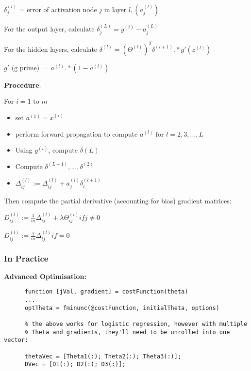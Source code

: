 \documentclass[12pt] {article}
\begin{document}
{      $\delta_j^{(l)}$ = error of activation node $j$ in layer $l, (a_j^{(l)})$

      For the output layer, calculate $\delta_j^{(L)} = y^{(i)} - a_j^{(L)}$

      For the hidden layers, calculate $\delta^{(l)} = (\Theta^{(l)})^T 
      \delta^{(l+1)} .* g'(z^{(l)})$

      $g' \text{ (g prime) } = a^{(l)} .* (1-a^{(l)})$

      \textbf{Procedure}:

      For $i = 1 \text{ to } m$
      \vspace{-1em}
      \begin{itemize}
        \item set $a^{(1)} = x^{(i)}$
        \item perform forward propagation to compute $a^{(l)} \text{ for } 
              l = 2,3,...,L$
        \item Using $y^{(i)}$, compute $\delta{(L)}$
        \item Compute $\delta^{(L-1)},\dots,\delta^{(2)}$
        \item $\Delta_{ij}^{(l)} := \Delta_{ij}^{(l)} + a_j^{(l)}
              \delta_i^{(l+1)}$
      \end{itemize}
      
      Then compute the partial derivative (accounting for bias) gradient
      matrices:

      $D_{ij}^{(l)} := \frac{1}{m} \Delta_{ij}^{(l)} + \lambda
      \Theta_{ij}^{(l)} if j \neq 0$

      $D_{ij}^{(l)} := \frac{1}{m} \Delta_{ij}^{(l)} if = 0$

      \newpage

    \subsubsection{In Practice}
    
      \textbf{Advanced Optimisation:}
      \begin{lstlisting}
      function [jVal, gradient] = costFunction(theta)
      ...
      optTheta = fminunc(@costFunction, initialTheta, options)
      
      % the above works for logistic regression, however with multiple
      % Theta and gradients, they'll need to be unrolled into one vector:

      thetaVec = [Theta1(:); Theta2(:); Theta3(:)];
      DVec = [D1(:); D2(:); D3(:)];


\end{lstlisting}}
\end{document}
